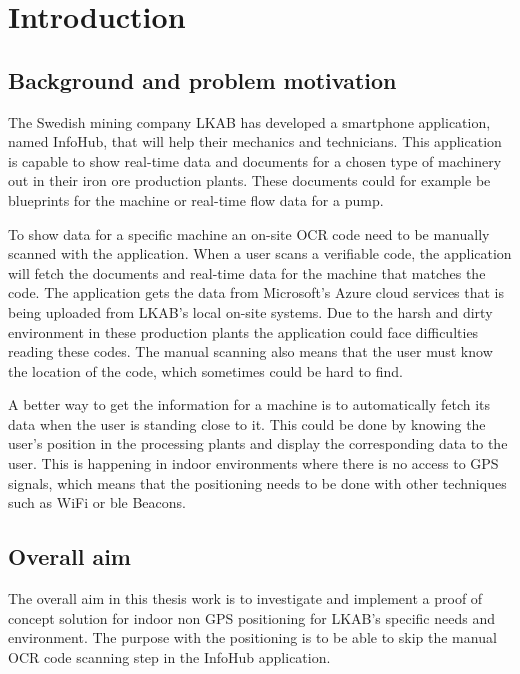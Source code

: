 \chapter{Introduction}\label{sec:intro} 

\section{Background and problem motivation}\label{sec:introBackground}
The Swedish mining company LKAB has developed a smartphone application, named InfoHub, that will help their mechanics and technicians.
This application is capable to show real-time data and documents for a chosen type of machinery out in their iron ore production plants.
These documents could for example be blueprints for the machine or real-time flow data for a pump.

\bigskip

To show data for a specific machine an on-site OCR code need to be manually scanned with the application.
When a user scans a verifiable code, the application will fetch the documents and real-time data for the machine that matches the code.
The application gets the data from Microsoft’s Azure cloud services that is being uploaded from LKAB’s local on-site systems.
Due to the harsh and dirty environment in these production plants the application could face difficulties reading these codes.
The manual scanning also means that the user must know the location of the code, which sometimes could be hard to find.

\bigskip

A better way to get the information for a machine is to automatically fetch its data when the user is standing close to it. 
This could be done by knowing the user's position in the processing plants and display the corresponding data to the user.
This is happening in indoor environments where there is no access to GPS signals, which means that the positioning needs to be done with other techniques such as WiFi or \acrlong{ble} Beacons.


\section{Overall aim}\label{sec:introOverallAim}
The overall aim in this thesis work is to investigate and implement a proof of concept solution for indoor non GPS positioning for LKAB's specific needs and environment.
The purpose with the positioning is to be able to skip the manual OCR code scanning step in the InfoHub application.


